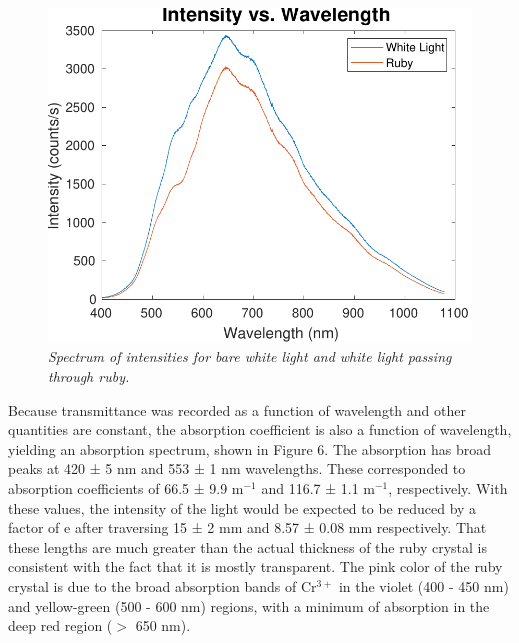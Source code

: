 \documentclass[11pt, a4paper, twocolumn]{article}
\begin{document}


\begin{figure}[]
\includegraphics[width=\linewidth]{doubleIntensityMeasurement.pdf}
\caption{\textit{Spectrum of intensities for bare white light and white light passing through ruby.}
}
\label{fig:intensities}
\end{figure}

Because transmittance was recorded as a function of wavelength and other quantities are constant, the absorption coefficient is also a function of wavelength, yielding an absorption spectrum, shown in Figure 6. The absorption has broad peaks at 420 ± 5 nm and 553 ± 1 nm wavelengths. These corresponded to absorption coefficients of 66.5 ± 9.9 m$^{-1}$ and 116.7 ± 1.1 m$^{-1}$, respectively. With these values, the intensity of the light would be expected to be reduced by a factor of e after traversing 15 ± 2 mm and 8.57 ± 0.08 mm respectively. That these lengths are much greater than the actual thickness of the ruby crystal is consistent with the fact that it is mostly transparent. The pink color of the ruby crystal is due to the broad absorption bands of Cr$^{3+}$ in the violet (400 - 450 nm) and yellow-green (500 - 600 nm) regions, with a minimum of absorption in the deep red region ($>$ 650 nm).
\end{document}
